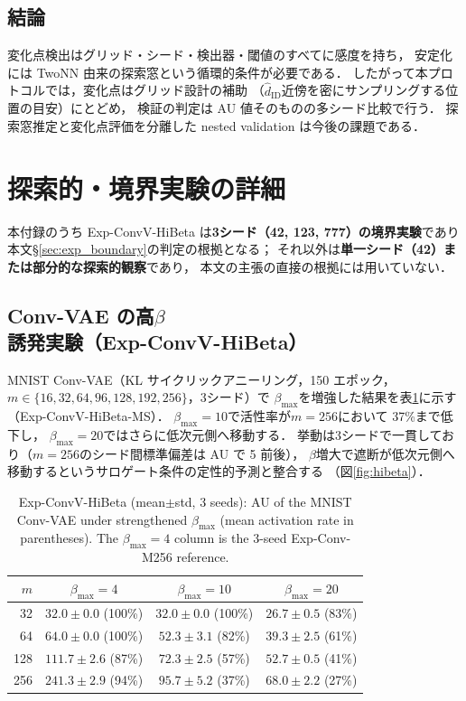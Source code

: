 \documentclass[11pt,a4paper]{jsarticle}
\newcommand{\hatdID}{\hat{d}_{\mathrm{ID}}}
\begin{document}
\subsection{結論}

変化点検出はグリッド・シード・検出器・閾値のすべてに感度を持ち，
安定化には TwoNN 由来の探索窓という循環的条件が必要である．
したがって本プロトコルでは，変化点はグリッド設計の補助
（$\hatdID$近傍を密にサンプリングする位置の目安）にとどめ，
検証の判定は AU 値そのものの多シード比較で行う．
探索窓推定と変化点評価を分離した nested validation は今後の課題である．

\section{探索的・境界実験の詳細}\label{app:exploratory}

本付録のうち Exp-ConvV-HiBeta は\textbf{3シード（42, 123, 777）の境界実験}であり
本文§\ref{sec:exp_boundary}の判定の根拠となる；
それ以外は\textbf{単一シード（42）または部分的な探索的観察}であり，
本文の主張の直接の根拠には用いていない．

\subsection{Conv-VAE の高$\beta$誘発実験（Exp-ConvV-HiBeta）}

MNIST Conv-VAE（KL サイクリックアニーリング，150 エポック，
$m \in \{16, 32, 64, 96, 128, 192, 256\}$，3シード）で
$\beta_{\max}$を増強した結果を表\ref{tab:hibeta}に示す（Exp-ConvV-HiBeta-MS）．
$\beta_{\max} = 10$で活性率が$m = 256$において 37\%まで低下し，
$\beta_{\max} = 20$ではさらに低次元側へ移動する．
挙動は3シードで一貫しており（$m = 256$のシード間標準偏差は AU で 5 前後），
$\beta$増大で遮断が低次元側へ移動するというサロゲート条件の定性的予測と整合する
（図\ref{fig:hibeta}）．

\begin{table}[H]
\centering
\caption{Exp-ConvV-HiBeta (mean$\pm$std, 3 seeds): AU of the MNIST
Conv-VAE under strengthened $\beta_{\max}$ (mean activation rate in
parentheses). The $\beta_{\max} = 4$ column is the 3-seed Exp-Conv-M256
reference.}
\label{tab:hibeta}
\small
\begin{tabular}{rccc}
\toprule
$m$ & $\beta_{\max} = 4$ & $\beta_{\max} = 10$ & $\beta_{\max} = 20$ \\
\midrule
 32 & $32.0 \pm 0.0$ (100\%) & $32.0 \pm 0.0$ (100\%) & $26.7 \pm 0.5$ (83\%) \\
 64 & $64.0 \pm 0.0$ (100\%) & $52.3 \pm 3.1$ (82\%) & $39.3 \pm 2.5$ (61\%) \\
128 & $111.7 \pm 2.6$ (87\%) & $72.3 \pm 2.5$ (57\%) & $52.7 \pm 0.5$ (41\%) \\
256 & $241.3 \pm 2.9$ (94\%) & $95.7 \pm 5.2$ (37\%) & $68.0 \pm 2.2$ (27\%) \\
\bottomrule
\end{tabular}
\end{table}
\end{document}
